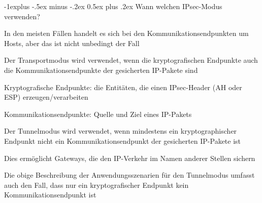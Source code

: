 \documentclass[a4paper]{article}
\makeatletter
\renewcommand{\subsection}{\@startsection{subsection}{2}{0mm}%
 {-1explus -.5ex minus -.2ex}%
 {0.5ex plus .2ex}%
 {\normalfont\normalsize\bfseries}}
\makeatother
\begin{document}
\begin{multicols}{3}
      \subsection{Wann welchen IPsec-Modus verwenden?}
      \begin{itemize*}
            \item In den meisten Fällen handelt es sich bei den Kommunikationsendpunkten um Hosts, aber das ist nicht unbedingt der Fall
            \item Der Transportmodus wird verwendet, wenn die kryptografischen Endpunkte auch die Kommunikationsendpunkte der gesicherten IP-Pakete sind
            \begin{itemize*}
                  \item Kryptografische Endpunkte: die Entitäten, die einen IPsec-Header (AH oder ESP) erzeugen/verarbeiten
                  \item Kommunikationsendpunkte: Quelle und Ziel eines IP-Pakets
            \end{itemize*}
            \item Der Tunnelmodus wird verwendet, wenn mindestens ein kryptographischer Endpunkt nicht ein Kommunikationsendpunkt der gesicherten IP-Pakete ist
            \begin{itemize*}
                  \item Dies ermöglicht Gateways, die den IP-Verkehr im Namen anderer Stellen sichern
            \end{itemize*}
            \item Die obige Beschreibung der Anwendungsszenarien für den Tunnelmodus umfasst auch den Fall, dass nur ein kryptografischer Endpunkt kein Kommunikationsendpunkt ist
      \end{itemize*}


\end{multicols}
\end{document}
